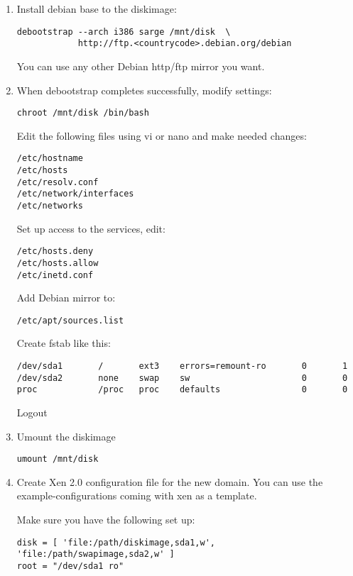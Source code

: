 \documentclass[11pt,twoside,final,openright]{xenstyle}
\begin{document}
{\begin{enumerate}
\item Install debian base to the diskimage:
\begin{verbatim}
debootstrap --arch i386 sarge /mnt/disk  \
            http://ftp.<countrycode>.debian.org/debian
\end{verbatim}

You can use any other Debian http/ftp mirror you want.

\item When debootstrap completes successfully, modify settings:
\begin{verbatim}
chroot /mnt/disk /bin/bash
\end{verbatim}

Edit the following files using vi or nano and make needed changes:
\begin{verbatim}
/etc/hostname
/etc/hosts
/etc/resolv.conf
/etc/network/interfaces
/etc/networks
\end{verbatim}

Set up access to the services, edit:
\begin{verbatim}
/etc/hosts.deny
/etc/hosts.allow
/etc/inetd.conf
\end{verbatim}

Add Debian mirror to:   
\begin{verbatim}
/etc/apt/sources.list
\end{verbatim}

Create fstab like this:
\begin{verbatim}
/dev/sda1       /       ext3    errors=remount-ro       0       1
/dev/sda2       none    swap    sw                      0       0
proc            /proc   proc    defaults                0       0
\end{verbatim}

Logout

\item      Umount the diskimage
\begin{verbatim}
umount /mnt/disk
\end{verbatim}

\item Create Xen 2.0 configuration file for the new domain. You can
        use the example-configurations coming with xen as a template.

        Make sure you have the following set up:
\begin{verbatim}
disk = [ 'file:/path/diskimage,sda1,w', 'file:/path/swapimage,sda2,w' ]
root = "/dev/sda1 ro"
\end{verbatim}


\end{enumerate}}
\end{document}
